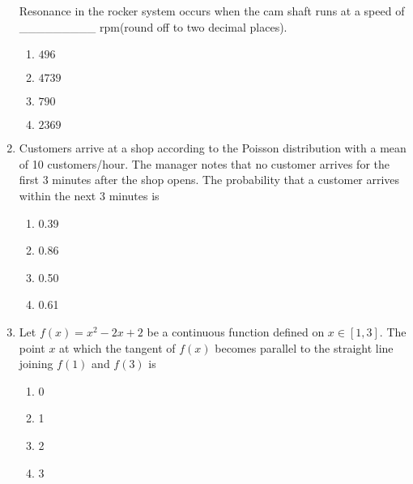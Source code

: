 \documentclass[journal,12pt,onecolumn]{IEEEtran}
\theoremstyle{remark}
\begin{document}
\begin{enumerate}
\begin{center}
	
\end{center}
Resonance in the rocker system occurs when the cam shaft runs at a speed of \_\_\_\_\_\_\_\_\_ rpm(round off to two decimal places).
\begin{enumerate}
	\item $496$
	\item $4739$
	\item $790$
	\item $2369$
\end{enumerate}

\item Customers arrive at a shop according to the Poisson distribution with a mean of 10 customers/hour. The manager notes that no customer arrives for the first 3 minutes after the shop opens. The probability that a customer arrives within the next 3 minutes is
\begin{enumerate}
	\item 0.39
	\item 0.86
	\item 0.50
	\item 0.61
\end{enumerate}
	
\item Let $f(x) = x^2 - 2x + 2$ be a continuous function defined on $x \in [1, 3]$. The point $x$ at which the tangent of $f(x)$ becomes parallel to the straight line joining $f(1)$ and $f(3)$ is
\begin{enumerate}
	\item 0
	\item 1
	\item 2
	\item 3
\end{enumerate}


\end{enumerate}
\end{document}
